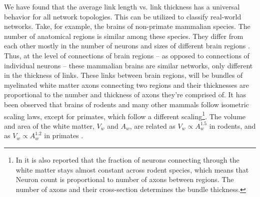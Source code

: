 \documentclass[nofootinbib,preprint,floatfix,titlepage,endfloats]{revtex4} %
\begin{document}
We have found that the average link length vs. link thickness has a universal behavior for all network topologies. 
This can be utilized to classify real-world networks. 
Take, for example, the brains of non-primate mammalian species. 
The number of anatomical regions is similar among these species. 
They differ from each other mostly in the number of neurons and sizes of different brain regions \cite{azevedo2009equal, herculano2012remarkable, herculano2014brain}. 
Thus, at the level of connections of brain regions -- as opposed to connections of individual neurons -- these mammalian brains are similar networks, only different in the thickness of links. 
These links 
between brain regions, will be bundles of myelinated white matter axons connecting two regions and their thicknesses are proportional to the number and thickness of axons they're comprised of. 
It has been observed that brains of rodents \cite{herculano2012remarkable} and many other mammals \cite{herculano2014brain} follow isometric scaling laws, except for primates, which follow a different scaling\footnote{In \cite{herculano2012remarkable} it is also reported that the fraction of neurons connecting through the white matter stays almost constant across rodent species, which means that Neuron count is proportional to number of axons between regions. The number of axons and their cross-section determines the bundle thickness.}. 
The volume and area of the white matter, $V_w$ and $A_w$, are related as $V_w\propto A_w^{1.5}$ in rodents, and as $V_w \propto A_w^{1.2}$ in primates  \cite{herculano2012remarkable}. 
\end{document}
